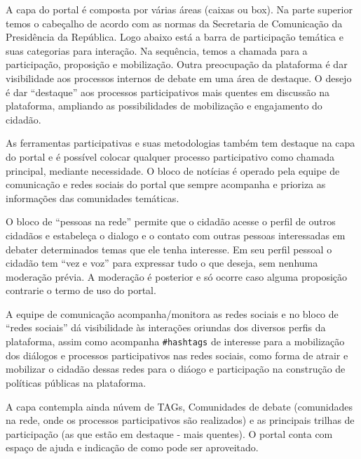 \documentclass{article}
\begin{document}
A capa do portal é composta por várias áreas (caixas ou box). Na parte superior
temos o cabeçalho de acordo com as normas da Secretaria de Comunicação da
Presidência da República. Logo abaixo está a barra de participação temática e
suas categorias para interação. Na sequência, temos a chamada para a
participação, proposição e mobilização. Outra preocupação da plataforma é dar
visibilidade aos processos internos de debate em uma área de destaque. O desejo
é dar ``destaque'' aos processos participativos mais quentes em discussão na
plataforma, ampliando as possibilidades de mobilização e engajamento do
cidadão.

As ferramentas participativas e suas metodologias também tem destaque na capa
do portal e é possível colocar qualquer processo participativo como chamada
principal, mediante necessidade. O bloco de notícias é operado pela equipe de
comunicação e redes sociais do portal que sempre acompanha e prioriza as
informações das comunidades temáticas.

O bloco de ``pessoas na rede'' permite que o cidadão acesse o perfil de outros
cidadãos e estabeleça o dialogo e o contato com outras pessoas interessadas em
debater determinados temas que ele tenha interesse. Em seu perfil pessoal o
cidadão tem ``vez e voz'' para expressar tudo o que deseja, sem nenhuma moderação
prévia. A moderação é posterior e só ocorre caso alguma proposição contrarie o
termo de uso do portal.

A equipe de comunicação acompanha/monitora as redes sociais e no bloco de
``redes sociais''  dá visibilidade às interações oriundas dos diversos perfis da
plataforma, assim como acompanha \texttt{\#hashtags} de interesse para a mobilização dos
diálogos e processos participativos nas redes sociais, como forma de atrair e
mobilizar o cidadão dessas redes para o diáogo e participação na construção de
políticas públicas na plataforma.

A capa contempla ainda núvem de TAGs, Comunidades de debate (comunidades na
rede, onde os processos participativos são realizados) e as principais trilhas
de participação (as que estão em destaque - mais quentes). O portal conta com
espaço de ajuda e indicação de como pode ser aproveitado.
\end{document}
